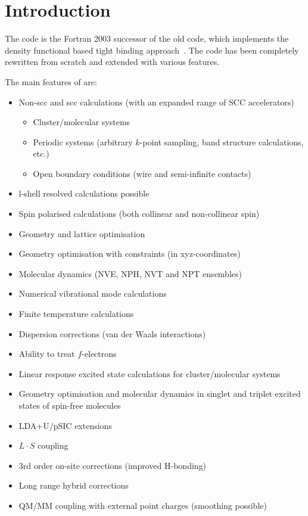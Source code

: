 \chapter{Introduction}

The code {\dftbp} is the Fortran 2003 successor of the old {\dftb} code, which
implements the density functional based tight binding
approach~\cite{frauenheim-JPCM-14-3015}. The code has been completely rewritten
from scratch and extended with various features.

The main features of {\dftbp} are:
\begin{itemize}
\item Non-scc and scc calculations (with an expanded range of SCC
  accelerators)
  \begin{itemize}
  \item Cluster/molecular systems
  \item Periodic systems (arbitrary $k$-point sampling, band structure
    calculations, etc.)
  \item Open boundary conditions (wire and semi-infinite contacts)
  \end{itemize}
\item l-shell resolved calculations possible
\item Spin polarised calculations (both collinear and non-collinear
  spin)
\item Geometry and lattice optimisation
\item Geometry optimisation with constraints (in xyz-coordinates)
\item Molecular dynamics (NVE, NPH, NVT and NPT ensembles)
\item Numerical vibrational mode calculations
\item Finite temperature calculations
\item Dispersion corrections (van der Waals interactions)
\item Ability to treat $f$-electrons
\item Linear response excited state calculations for cluster/molecular systems
\item Geometry optimisation and molecular dynamics in singlet and triplet
  excited states of spin-free molecules
\item LDA+U/pSIC extensions
\item $L \cdot S$ coupling
\item 3rd order on-site corrections (improved H-bonding)
\item Long range hybrid corrections
\item QM/MM coupling with external point charges (smoothing possible)

\end{itemize}
